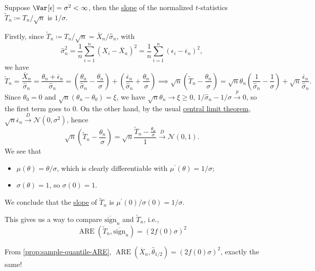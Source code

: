 \begin{eg}[\(t\)-test]
	Suppose \(\Var_{}[\epsilon ] = \sigma ^2 < \infty \), then the \hyperref[def:slope]{slope} of the normalized \(t\)-statistics \(\widetilde{T} _n \coloneqq T_n / \sqrt{n}\) is \(1 / \sigma \).
\end{eg}
\begin{explanation}
	Firstly, since \(\widetilde{T} _n \coloneqq T_n / \sqrt{n} = \overline{X} _n / \hat{\sigma} _n\), with
	\[
		\hat{\sigma} _n^2
		= \frac{1}{n} \sum_{i=1}^{n} (X_i - \overline{X} _n)^2
		= \frac{1}{n} \sum_{i=1}^{n} (\epsilon _i - \overline{\epsilon} _n)^2,
	\]
	we have
	\[
		\widetilde{T} _n
		= \frac{\overline{X} _n}{\hat{\sigma} _n}
		= \frac{\theta _n + \overline{\epsilon} _n}{\hat{\sigma} _n}
		= \left( \frac{\theta _n}{\hat{\sigma} _n} - \frac{\theta _n}{\sigma } \right) + \left( \frac{\overline{\epsilon} _n}{\hat{\sigma} _n} + \frac{\theta _n}{\sigma } \right)
		\implies
		\sqrt{n} \left( \widetilde{T} _n - \frac{\theta _n}{\sigma } \right)
		= \sqrt{n} \theta _n \left( \frac{1}{\hat{\sigma} _n} - \frac{1}{\sigma } \right) + \sqrt{n} \frac{\overline{\epsilon} _n}{\hat{\sigma} _n}.
	\]
	Since \(\theta _0 = 0\) and \(\sqrt{n} (\theta _n - \theta _0) = \xi \), we have \(\sqrt{n} \theta _n \to \xi \geq 0\), \(1 / \hat{\sigma} _n - 1 / \sigma \overset{p}{\to} 0\), so the first term goes to \(0\). On the other hand, by the usual \hyperref[thm:CLT]{central limit theorem}, \(\sqrt{n} \overline{\epsilon} _n \overset{D}{\to} \mathcal{N} (0, \sigma ^2)\), hence
	\[
		\sqrt{n} \left( \widetilde{T} _n - \frac{\theta _n}{\sigma } \right)
		= \sqrt{n} \frac{\widetilde{T} _n - \frac{\theta _n}{\sigma }}{1}
		\overset{D}{\to} \mathcal{N} (0, 1).
	\]
	We see that
	\begin{itemize}
		\item \(\mu (\theta ) = \theta / \sigma \), which is clearly differentiable with \(\mu ^{\prime} (\theta ) = 1 / \sigma \);
		\item \(\sigma (\theta ) = 1\), so \(\sigma (0) = 1\).
	\end{itemize}
	We conclude that the \hyperref[def:slope]{slope} of \(\widetilde{T} _n\) is \(\mu ^{\prime} (0) / \sigma (0) = 1 / \sigma \).
\end{explanation}

This gives us a way to compare \(\overline{\mathrm{sign} }_n \) and \(\widetilde{T} _n\), i.e.,
\[
	\operatorname{ARE}(\widetilde{T} _n, \overline{\mathrm{sign}} _n)
	= \left( 2 f(0) \sigma \right) ^2
\]

\begin{prev}
	From \autoref{prop:sample-quantile-ARE}, \(\operatorname{ARE}(\overline{X} _n , \hat{\theta} _{1 / 2}) = (2 f(0) \sigma )^2\), exactly the same!
\end{prev}

